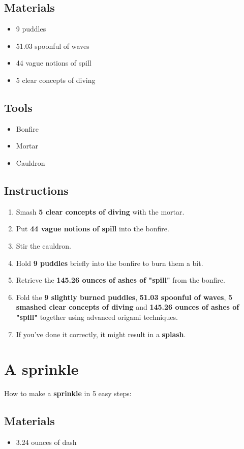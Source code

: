 \documentclass{article}
\begin{document}
\subsection{Materials}\begin{itemize}
\item 
9 puddles
\item 
51.03 spoonful of waves
\item 
44 vague notions of spill
\item 
5 clear concepts of diving
\end{itemize}
\subsection{Tools}\begin{itemize}
\item 
Bonfire
\item 
Mortar
\item 
Cauldron
\end{itemize}
\subsection{Instructions}\begin{enumerate}
\item 
Smash \textbf{5 clear concepts of diving} with the mortar.
\item 
Put \textbf{44 vague notions of spill} into the bonfire.
\item 
Stir the cauldron.
\item 
Hold \textbf{9 puddles} briefly into the bonfire to burn them a bit.
\item 
Retrieve the \textbf{145.26 ounces of ashes of "spill"} from the bonfire.
\item 
Fold the \textbf{9 slightly burned puddles}, \textbf{51.03 spoonful of waves}, \textbf{5 smashed clear concepts of diving} and \textbf{145.26 ounces of ashes of "spill"} together using advanced origami techniques.
\item 
If you've done it correctly, it might result in a \textbf{splash}.
\end{enumerate}
\newpage
\section{A sprinkle}How to make a \textbf{sprinkle} in 5 easy steps:

\subsection{Materials}\begin{itemize}
\item 
3.24 ounces of dash
\end{itemize}
\end{document}
